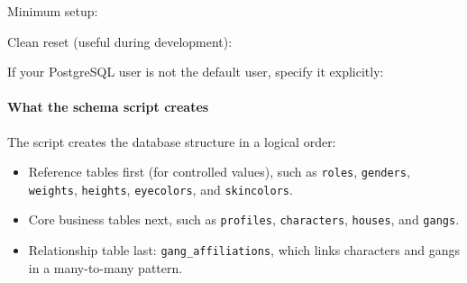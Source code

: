 Minimum setup:

\begin{Shaded}
\begin{Highlighting}[]
 
\end{Highlighting}
\end{Shaded}

Clean reset (useful during development):

\begin{Shaded}
\begin{Highlighting}[]
 
 
\end{Highlighting}
\end{Shaded}

If your PostgreSQL user is not the default user, specify it explicitly:

\begin{Shaded}
\begin{Highlighting}[]
 
\end{Highlighting}
\end{Shaded}

\hypertarget{what-the-schema-script-creates}{%
\paragraph{What the schema script
creates}\label{what-the-schema-script-creates}}

The script creates the database structure in a logical order:

\begin{itemize}
\tightlist
\item
  Reference tables first (for controlled values), such as
  \texttt{roles}, \texttt{genders}, \texttt{weights}, \texttt{heights},
  \texttt{eyecolors}, and \texttt{skincolors}.
\item
  Core business tables next, such as \texttt{profiles},
  \texttt{characters}, \texttt{houses}, and \texttt{gangs}.
\item
  Relationship table last: \texttt{gang\_affiliations}, which links
  characters and gangs in a many-to-many pattern.
\end{itemize}

